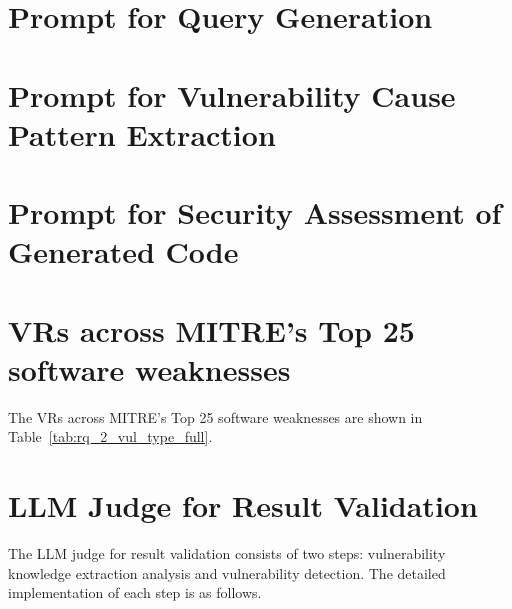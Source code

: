 \appendix

\newpage

\section{Prompt for Query Generation}


\section{Prompt for Vulnerability Cause Pattern Extraction}


\section{Prompt for Security Assessment of Generated Code}


\section{VRs across MITRE's Top 25 software weaknesses}
The VRs across MITRE's Top 25 software weaknesses are shown in Table~\ref{tab:rq_2_vul_type_full}.


\section{LLM Judge for Result Validation}
\label{sec_append:llm_juedge}
The LLM judge for result validation consists of two steps: vulnerability knowledge extraction analysis and vulnerability detection. The detailed implementation of each step is as follows.

